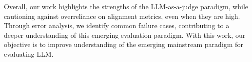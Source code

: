 Overall, our work highlights the strengths of the LLM-as-a-judge paradigm, while cautioning against overreliance on alignment metrics, even when they are high. Through error analysis, we identify common failure cases, contributing to a deeper understanding of this emerging evaluation paradigm. With this work, our objective is to improve understanding of the emerging mainstream paradigm for evaluating LLM.




